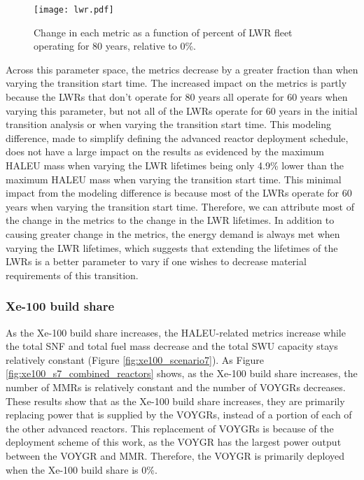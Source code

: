 \begin{figure}
    \centering
    \texttt{[image: lwr.pdf]}
    \caption{Change in each metric as a function of percent of LWR fleet  
    operating for 80 years, relative to 0\%.}
    \label{fig:lwr_scenario7}
\end{figure}

Across this parameter space, the metrics decrease by a greater fraction than 
when varying the transition start time. The increased impact on the metrics 
is partly because the \glspl{LWR} that don't operate for 80 years all operate for 
60 years when varying this parameter, but not all of the \glspl{LWR} operate for 
60 years in the initial transition analysis or when varying the transition
start time. This modeling difference, made to simplify defining the advanced 
reactor deployment schedule, does not have a large impact on the results as 
evidenced by the maximum \gls{HALEU} mass when varying the \gls{LWR} lifetimes 
being only 4.9\% lower than the maximum \gls{HALEU} mass when varying the 
transition start time. This minimal impact from the modeling difference is 
because most of the \glspl{LWR} operate for 60 years when varying the transition start 
time. Therefore, we can attribute most of the change in the metrics to the 
change in the \gls{LWR} lifetimes. In addition to causing greater change in 
the metrics, the energy demand is always met when varying the \gls{LWR} lifetimes,
which suggests that extending the lifetimes of the \glspl{LWR} is a better 
parameter to vary if one wishes to decrease material requirements of this 
transition. 

\subsubsection{Xe-100 build share}
As the Xe-100 build share increases, the \gls{HALEU}-related metrics 
increase while the total \gls{SNF} and total fuel mass decrease and the 
total \gls{SWU} capacity stays relatively constant (Figure \ref{fig:xe100_scenario7}).
As Figure \ref{fig:xe100_s7_combined_reactors} shows, as the Xe-100 build share 
increases, the number of \glspl{MMR} is relatively constant and the number of 
VOYGRs decreases. These results show that as the Xe-100 build share increases, they 
are primarily replacing power that is supplied by the VOYGRs, instead of a portion 
of each of the other advanced reactors. This replacement of VOYGRs is because 
of the deployment scheme of this work, as the VOYGR has the largest power output 
between the VOYGR and \gls{MMR}. Therefore, the VOYGR is primarily deployed when 
the Xe-100 build share is 0\%. 


